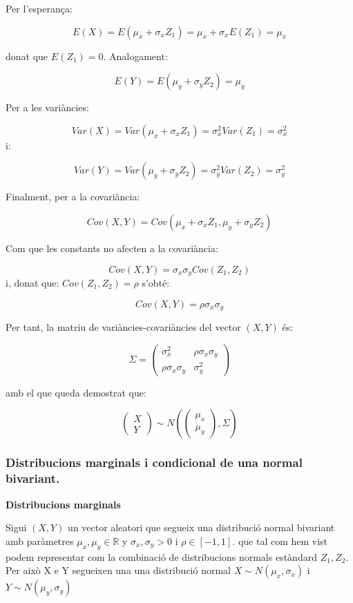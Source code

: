 \documentclass[
  catalan,
]{article}
\theoremstyle{definition}
\theoremstyle{definition}
\theoremstyle{definition}
\theoremstyle{definition}
\theoremstyle{remark}
\begin{document}
Per l'esperança:

\[
E(X)=E(\mu_x+\sigma_x Z_1) =\mu_x+\sigma_xE(Z_1) =\mu_x
\]

donat que \(E(Z_1)=0\). Analogament:

\[
E(Y)=E(\mu_y+\sigma_y Z_2)=\mu_y
\]

Per a les variàncies:

\[
Var(X)=Var(\mu_x+\sigma_x Z_1)=\sigma_x^2Var(Z_1)=\sigma_x^2
\]
i:

\[
Var(Y)=Var(\mu_y+\sigma_y Z_2)=\sigma_y^2Var(Z_2)=\sigma_y^2
\]

Finalment, per a la covariància:

\[
Cov(X,Y)=Cov(\mu_x+\sigma_x Z_1,\mu_y+\sigma_y Z_2)
\]

Com que les constants no afecten a la covariància:

\[
Cov(X,Y)=\sigma_x\sigma_y Cov(Z_1,Z_2)
\]
i, donat que: \(Cov(Z_1,Z_2)=\rho\) s'obté:

\[
Cov(X,Y)=\rho\sigma_x\sigma_y
\]

Per tant, la matriu de variàncies-covariàncies del vector \((X,Y)\) és:

\[
\Sigma=
\begin{pmatrix}
\sigma_x^2 & \rho\sigma_x\sigma_y\\
\rho\sigma_x\sigma_y & \sigma_y^2
\end{pmatrix}
\]

amb el que queda demostrat que:

\[
\begin{pmatrix}
X\\
Y
\end{pmatrix}
\sim
N
\left(
\begin{pmatrix}
\mu_x\\
\mu_y
\end{pmatrix},
\Sigma
\right)
\]

\subsubsection{Distribucions marginals i condicional de una normal bivariant.}\label{distribucions-marginals-i-condicional-de-una-normal-bivariant.}

\textbf{Distribucions marginals}

Sigui \((X,Y)\) un vector aleatori que segueix una distribució normal bivariant amb paràmetres \(\mu_x,\mu_y\in\mathbb{R}\) y \(\sigma_x,\sigma_y>0\) i \(\rho \in [-1,1]\). que tal com hem vist podem representar com la combinació de distribucions normals estàndard \(Z_1,Z_2\). Per això X e Y segueixen una una distribució normal \(X \sim N(\mu_x,\sigma_x)\) i \(Y \sim N(\mu_y,\sigma_y)\)
\end{document}
